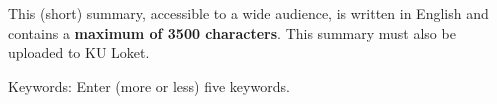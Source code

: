 
This (short) summary, accessible to a wide audience, is written in English and contains a \textbf{maximum of 3500 characters}. This summary must also be uploaded to KU Loket.


Keywords: Enter (more or less) five keywords.

